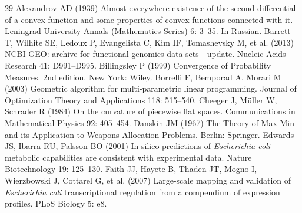\begin{thebibliography}{29}
\setlength{\itemsep}{2pt}
\small
{}
Alexandrov AD (1939) Almost everywhere existence of the second differential of a
             convex function and some properties of convex functions
             connected with it. Leningrad University Annals (Mathematics Series) 6: 3--35. In Russian.
Barrett T, Wilhite SE, Ledoux P, Evangelista C, Kim IF, Tomashevsky M, et al. (2013) {NCBI GEO}: archive for functional genomics data sets---update. Nucleic Acids Research 41: D991--D995.
Billingsley P (1999) Convergence of Probability Measures. 2nd edition. New York: Wiley.
Borrelli F, Bemporad A, Morari M (2003) Geometric algorithm for multi-parametric linear
             programming. Journal of Optimization Theory and Applications 118: 515--540.
Cheeger J, M{\"u}ller W, Schrader R (1984) On the curvature of piecewise flat spaces. Communications in Mathematical Physics 92: 405--454.
Danskin JM (1967) The Theory of Max-Min and its Application to Weapons
               Allocation Problems. Berlin: Springer.
Edwards JS, Ibarra RU, Palsson BO (2001) In silico predictions of \emph{Escherichia coli} metabolic
             capabilities are consistent with experimental data. Nature Biotechnology 19: 125--130.
Faith JJ, Hayete B, Thaden JT, Mogno I, Wierzbowski J, Cottarel G, et al. (2007) Large-scale mapping and validation of \emph{Escherichia coli}
             transcriptional regulation from a compendium of expression
             profiles. PLoS Biology 5: e8.

\end{thebibliography}
